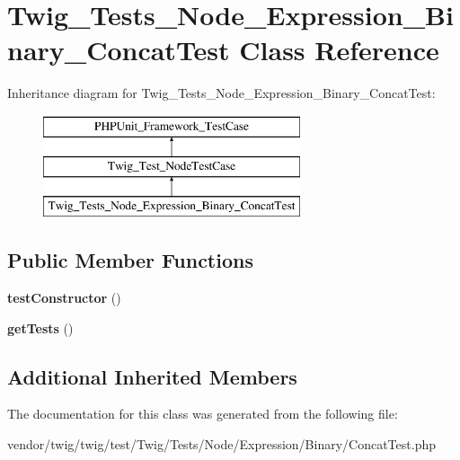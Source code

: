 \hypertarget{classTwig__Tests__Node__Expression__Binary__ConcatTest}{}\section{Twig\+\_\+\+Tests\+\_\+\+Node\+\_\+\+Expression\+\_\+\+Binary\+\_\+\+Concat\+Test Class Reference}
\label{classTwig__Tests__Node__Expression__Binary__ConcatTest}
Inheritance diagram for Twig\+\_\+\+Tests\+\_\+\+Node\+\_\+\+Expression\+\_\+\+Binary\+\_\+\+Concat\+Test\+:\begin{figure}[H]
\begin{center}
\leavevmode
\includegraphics[height=3.000000cm]{classTwig__Tests__Node__Expression__Binary__ConcatTest}
\end{center}
\end{figure}
\subsection*{Public Member Functions}
\begin{DoxyCompactItemize}
\item 
{\bfseries test\+Constructor} ()\hypertarget{classTwig__Tests__Node__Expression__Binary__ConcatTest_af8c8376b3d9932e7f4554c675f300c12}{}\label{classTwig__Tests__Node__Expression__Binary__ConcatTest_af8c8376b3d9932e7f4554c675f300c12}

\item 
{\bfseries get\+Tests} ()\hypertarget{classTwig__Tests__Node__Expression__Binary__ConcatTest_a0630e29faa7c74ced8bde900e58e2725}{}\label{classTwig__Tests__Node__Expression__Binary__ConcatTest_a0630e29faa7c74ced8bde900e58e2725}

\end{DoxyCompactItemize}
\subsection*{Additional Inherited Members}


The documentation for this class was generated from the following file\+:\begin{DoxyCompactItemize}
\item 
vendor/twig/twig/test/\+Twig/\+Tests/\+Node/\+Expression/\+Binary/Concat\+Test.\+php\end{DoxyCompactItemize}
